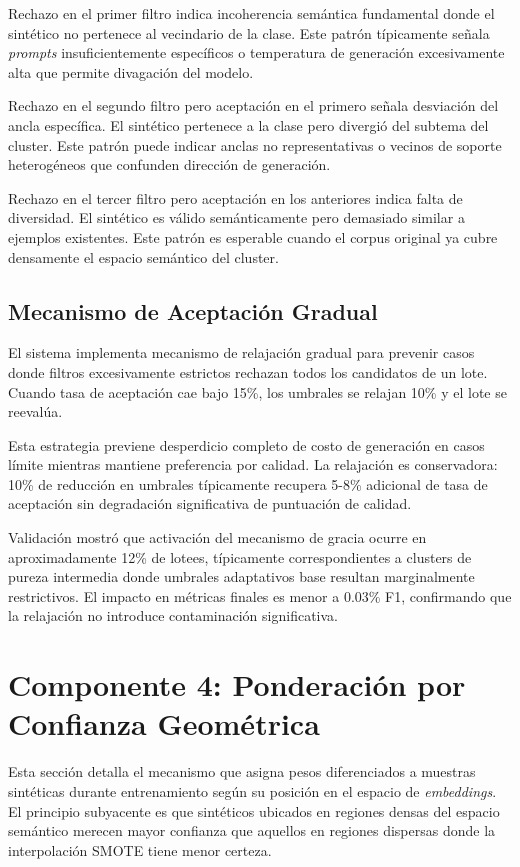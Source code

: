 Rechazo en el primer filtro indica incoherencia semántica fundamental donde el sintético no pertenece al vecindario de la clase. Este patrón típicamente señala \textit{prompts} insuficientemente específicos o temperatura de generación excesivamente alta que permite divagación del modelo.

Rechazo en el segundo filtro pero aceptación en el primero señala desviación del ancla específica. El sintético pertenece a la clase pero divergió del subtema del cluster. Este patrón puede indicar anclas no representativas o vecinos de soporte heterogéneos que confunden dirección de generación.

Rechazo en el tercer filtro pero aceptación en los anteriores indica falta de diversidad. El sintético es válido semánticamente pero demasiado similar a ejemplos existentes. Este patrón es esperable cuando el corpus original ya cubre densamente el espacio semántico del cluster.

\subsection{Mecanismo de Aceptación Gradual}
\label{subsec:grace}

El sistema implementa mecanismo de relajación gradual para prevenir casos donde filtros excesivamente estrictos rechazan todos los candidatos de un lote. Cuando tasa de aceptación cae bajo 15\%, los umbrales se relajan 10\% y el lote se reevalúa.

Esta estrategia previene desperdicio completo de costo de generación en casos límite mientras mantiene preferencia por calidad. La relajación es conservadora: 10\% de reducción en umbrales típicamente recupera 5-8\% adicional de tasa de aceptación sin degradación significativa de puntuación de calidad.

Validación mostró que activación del mecanismo de gracia ocurre en aproximadamente 12\% de lotees, típicamente correspondientes a clusters de pureza intermedia donde umbrales adaptativos base resultan marginalmente restrictivos. El impacto en métricas finales es menor a 0.03\% F1, confirmando que la relajación no introduce contaminación significativa.

\section{Componente 4: Ponderación por Confianza Geométrica}
\label{sec:ponderacion}

Esta sección detalla el mecanismo que asigna pesos diferenciados a muestras sintéticas durante entrenamiento según su posición en el espacio de \textit{embeddings}. El principio subyacente es que sintéticos ubicados en regiones densas del espacio semántico merecen mayor confianza que aquellos en regiones dispersas donde la interpolación SMOTE tiene menor certeza.

